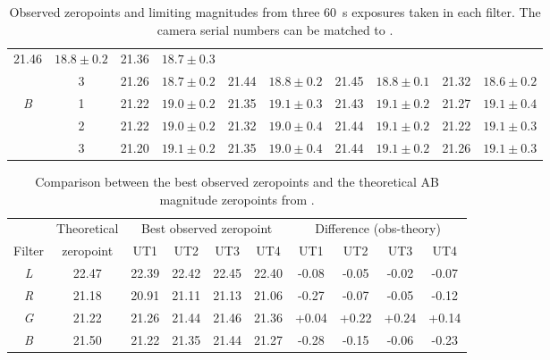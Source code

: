 \begin{colsection}
\begin{colsection}
\begin{table}[p]
\begin{center}
\begin{tabular}{cc|cc|cc|cc|cc}
            21.46 & $18.8 \pm 0.2$ &
            21.36 & $18.7 \pm 0.3$
            \\
            & 3 &
            21.26 & $18.7 \pm 0.2$ &
            21.44 & $18.8 \pm 0.2$ &
            21.45 & $18.8 \pm 0.1$ &
            21.32 & $18.6 \pm 0.2$
            \\
            \midrule
            \textit{B} & 1 &
            21.22 & $19.0 \pm 0.2$ &
            21.35 & $19.1 \pm 0.3$ &
            21.43 & $19.1 \pm 0.2$ &
            21.27 & $19.1 \pm 0.4$
            \\
            & 2 &
            21.22 & $19.0 \pm 0.2$ &
            21.32 & $19.0 \pm 0.4$ &
            21.44 & $19.1 \pm 0.2$ &
            21.22 & $19.1 \pm 0.3$
            \\
            & 3 &
            21.20 & $19.1 \pm 0.2$ &
            21.35 & $19.0 \pm 0.4$ &
            21.44 & $19.1 \pm 0.2$ &
            21.26 & $19.1 \pm 0.3$
            \\
        \end{tabular}
    \end{center}
    \caption[Observed zeropoints and limiting magnitudes]{
        Observed zeropoints and limiting magnitudes from three \SI{60}{\second} exposures taken in each filter. The camera serial numbers can be matched to .
    }\label{tab:zps_lms}
\end{table}

\begin{table}[p]
    \begin{center}
        \begin{tabular}{c|c|cccc|cccc} %
             &
            Theoretical &
            \multicolumn{4}{c|}{Best observed zeropoint} &
            \multicolumn{4}{c}{Difference (obs-theory)}
            \\
            Filter & zeropoint & UT1 & UT2 & UT3 & UT4 & UT1 & UT2 & UT3 & UT4 \\
            \midrule
            \textit{L} & 22.47 & 22.39 & 22.42 & 22.45 & 22.40 & -0.08 & -0.05 & -0.02 & -0.07 \\
            \textit{R} & 21.18 & 20.91 & 21.11 & 21.13 & 21.06 & -0.27 & -0.07 & -0.05 & -0.12 \\
            \textit{G} & 21.22 & 21.26 & 21.44 & 21.46 & 21.36 & +0.04 & +0.22 & +0.24 & +0.14 \\
            \textit{B} & 21.50 & 21.22 & 21.35 & 21.44 & 21.27 & -0.28 & -0.15 & -0.06 & -0.23 \\
        \end{tabular}
    \end{center}
    \caption[Comparison between theoretical and observed zeropoints]{
        Comparison between the best observed zeropoints and the theoretical AB magnitude zeropoints from .
    }\label{tab:zps_comparison}
\end{table}


\end{colsection}
\end{colsection}
